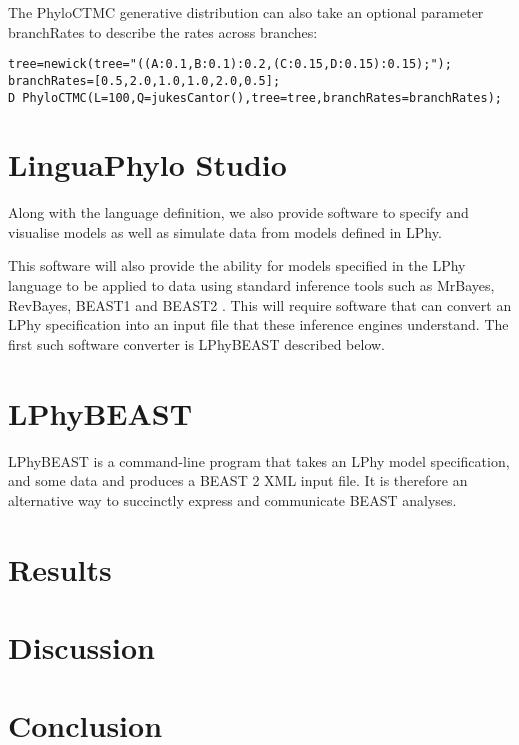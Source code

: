 \documentclass[10pt,letterpaper,table]{article}
\begin{document}
The PhyloCTMC generative distribution can also take an optional parameter branchRates to describe the
rates across branches:

\begin{alltt}
  tree = newick(tree="((A:0.1,B:0.1):0.2,(C:0.15,D:0.15):0.15);");
  branchRates = [0.5, 2.0, 1.0, 1.0, 2.0, 0.5];
  D ~ PhyloCTMC(L=100, Q=jukesCantor(), tree=tree, branchRates=branchRates);
\end{alltt}

\section*{LinguaPhylo Studio}

Along with the language definition, we also provide software to
specify and visualise models as well as simulate data from models
defined in LPhy.

This software will also provide the ability for models specified in
the LPhy language to be applied to data using standard inference tools
such as MrBayes, RevBayes, BEAST1 and BEAST2
\cite{bouckaert2014beastanalysis,DrummondBouckaert2015,bouckaert2019beastanalysis}.
This will require software that can convert an LPhy specification into
an input file that these inference engines understand.
The first such software converter is LPhyBEAST described below.

\section*{LPhyBEAST}

LPhyBEAST is a command-line program that takes an LPhy model
specification, and some data and produces a BEAST 2 XML input file.
It is therefore an alternative way to succinctly express and
communicate BEAST analyses.

\section*{Results}

\section*{Discussion}

\section*{Conclusion}
\end{document}
